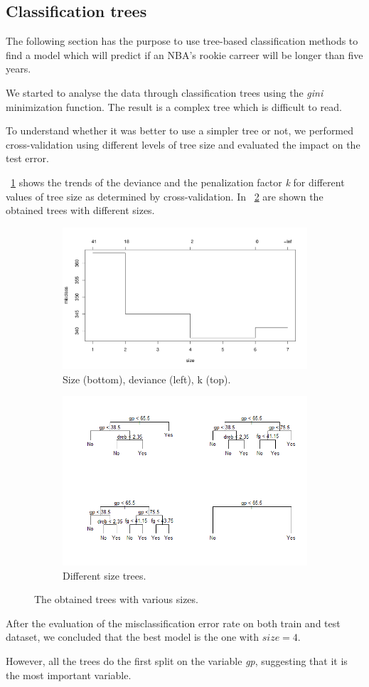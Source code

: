 \subsection{Classification trees}

The following section has the purpose to use tree-based classification methods to find a model which will predict if an NBA's rookie carreer will be longer than five years.

We started to analyse the data through classification trees using the \textit{gini} minimization function. The result is a complex tree which is difficult to read.

To understand whether it was better to use a simpler tree or not, we performed cross-validation using different levels of tree size and evaluated the impact on the test error.

\Fig~\ref{fig:tree_cv_plot} shows the trends of the deviance and the penalization factor \textit{k} for different values of tree size as determined by cross-validation. In \Fig~\ref{fig:tree_prune_comparison} are shown the obtained trees with different sizes.

\begin{figure}[h]
	\centering
	\begin{subfigure}{.6\textwidth}
		\centering
		\includegraphics[width=0.5\linewidth]{ImageFiles/Classification/Trees/tree_cv_plot}
		\caption{Size (bottom), deviance (left), k (top).}
		\label{fig:tree_cv_plot}
	\end{subfigure}%
	\begin{subfigure}{.6\textwidth}
		\centering
		\includegraphics[width=0.5\linewidth]{ImageFiles/Classification/Trees/tree_prune_comparison}
		\caption{Different size trees.}
		\label{fig:tree_prune_comparison}
	\end{subfigure}
	\caption{The obtained trees with various sizes.}
	\label{fig:treeSize}
\end{figure}

After the evaluation of the misclassification error rate on both train and test dataset, we concluded that the best model is the one with $size = 4$.

However, all the trees do the first split on the variable \textit{gp}, suggesting that it is the most important variable.
